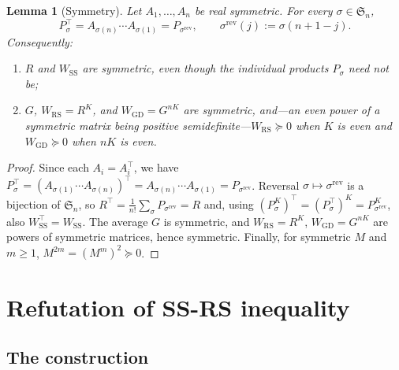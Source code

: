 \documentclass[11pt]{article}
\newtheorem{lemma}[theorem]{Lemma}
\theoremstyle{definition}
\theoremstyle{remark}
\newcommand{\Sn}{\mathfrak{S}_n}
\newcommand{\Wss}{W_{\mathrm{SS}}}
\newcommand{\Wrs}{W_{\mathrm{RS}}}
\newcommand{\Wgd}{W_{\mathrm{GD}}}
\newcommand{\psdge}{\succeq}
\begin{document}
\begin{lemma}[Symmetry]\label{lem:sym}
Let $A_1,\dots,A_n$ be real symmetric. For every $\sigma\in\Sn$,
\[
P_\sigma^\top=A_{\sigma(n)}\cdots A_{\sigma(1)}=P_{\sigma^{\mathrm{rev}}},
\qquad \sigma^{\mathrm{rev}}(j):=\sigma(n+1-j).
\]
Consequently:
\begin{enumerate}
\item $R$ and $\Wss$ are symmetric, even though the individual products $P_\sigma$ need not be;
\item $G$, $\Wrs=R^K$, and $\Wgd=G^{nK}$ are symmetric, and---an even power of a symmetric matrix being
positive semidefinite---$\Wrs\psdge0$ when $K$ is even and $\Wgd\psdge0$ when $nK$ is even.
\end{enumerate}
\end{lemma}

\begin{proof}
Since each $A_i=A_i^\top$, we have $P_\sigma^\top=(A_{\sigma(1)}\cdots A_{\sigma(n)})^\top
=A_{\sigma(n)}\cdots A_{\sigma(1)}=P_{\sigma^{\mathrm{rev}}}$. Reversal $\sigma\mapsto\sigma^{\mathrm{rev}}$
is a bijection of $\Sn$, so $R^\top=\frac1{n!}\sum_\sigma P_{\sigma^{\mathrm{rev}}}=R$ and, using
$(P_\sigma^K)^\top=(P_\sigma^\top)^K=P_{\sigma^{\mathrm{rev}}}^K$, also $\Wss^\top=\Wss$. The average $G$
is symmetric, and $\Wrs=R^K$, $\Wgd=G^{nK}$ are powers of symmetric matrices, hence symmetric. Finally,
for symmetric $M$ and $m\ge1$, $M^{2m}=(M^m)^2\psdge0$.
\end{proof}


\section{Refutation of SS-RS inequality}\label{sec:refute}

\subsection{The construction}
\end{document}
